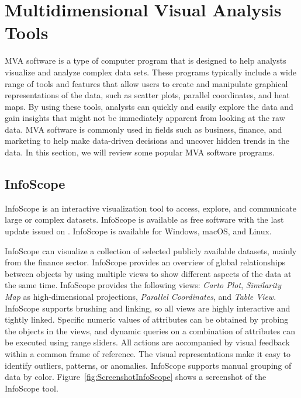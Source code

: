 
\chapter{Multidimensional Visual Analysis Tools}

\label{chap:MVATools}

MVA software is a type of computer program that is designed to help
analysts visualize and analyze complex data sets. These programs typically
include a wide range of tools and features that allow users to create and
manipulate graphical representations of the data, such as scatter plots,
parallel coordinates, and heat maps. By using these tools, analysts can
quickly and easily explore the data and gain insights that might not be
immediately apparent from looking at the raw data. MVA software is
commonly used in fields such as business, finance, and marketing to help
make data-driven decisions and uncover hidden trends in the data. In this
section, we will review some popular MVA software programs.




\section{InfoScope}

InfoScope \parencite{InfoScope} is an interactive visualization tool
to access, explore, and communicate large or complex
datasets. InfoScope is available as free software with the last update
issued on . InfoScope is available for Windows, 
macOS, and Linux.

InfoScope can visualize a collection of selected publicly available
datasets, mainly from the finance sector. InfoScope provides an overview
of global relationships between objects by using multiple views to show
different aspects of the data at the same time. InfoScope provides the
following views: \emph{Carto Plot}, \emph{Similarity Map} as
high-dimensional projections, \emph{Parallel Coordinates}, and \emph{Table
View}. InfoScope supports brushing and linking, so all views are highly
interactive and tightly linked. Specific numeric values of attributes can
be obtained by probing the objects in the views, and dynamic queries on a
combination of attributes can be executed using range sliders. All actions
are accompanied by visual feedback within a common frame of reference. The
visual representations make it easy to identify outliers, patterns, or
anomalies. InfoScope supports manual grouping of data by color.
Figure~\ref{fig:ScreenshotInfoScope} shows a screenshot of the InfoScope
tool.




